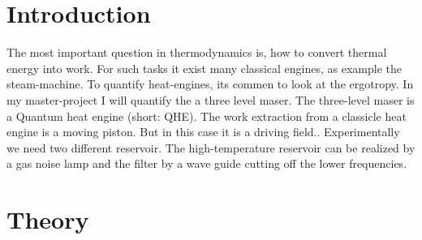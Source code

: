 \documentclass[12pt,a4paper]{article}
\begin{document}
\tableofcontents
\newpage
\section{Introduction}

The most important question in thermodynamics is, how to convert thermal energy into work. For such tasks it exist many classical engines, as example the steam-machine. To quantify heat-engines, its commen to look at the ergotropy. In my master-project I will quantify the a three level maser. The three-level maser is a Quantum heat engine (short: QHE).
The work extraction from a classicle heat engine is a moving piston. But in this case it is a driving field..
Experimentally we need two different reservoir. The high-temperature reservoir can be realized by a gas noise lamp and the filter by a wave guide cutting off the lower frequencies.
 

\section{Theory}
\end{document}
